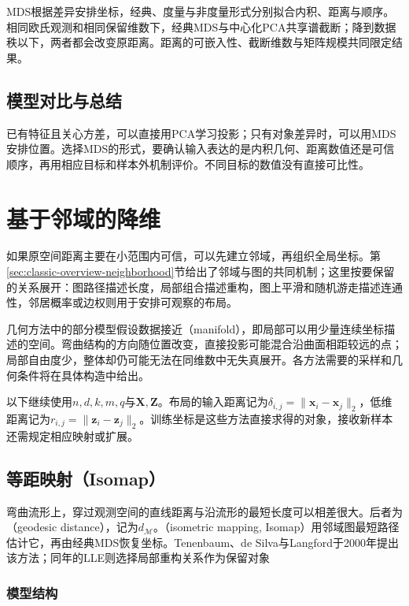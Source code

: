 MDS根据差异安排坐标，经典、度量与非度量形式分别拟合内积、距离与顺序。相同欧氏观测和相同保留维数下，经典MDS与中心化PCA共享谱截断；降到数据秩以下，两者都会改变原距离。距离的可嵌入性、截断维数与矩阵规模共同限定结果。

\subsection{模型对比与总结}

已有特征且关心方差，可以直接用PCA学习投影；只有对象差异时，可以用MDS安排位置。选择MDS的形式，要确认输入表达的是内积几何、距离数值还是可信顺序，再用相应目标和样本外机制评价。不同目标的数值没有直接可比性。

\section{基于邻域的降维}
\label{sec:dim-neighbors}
\label{sec:dim-manifold}

如果原空间距离主要在小范围内可信，可以先建立邻域，再组织全局坐标。第\ref{sec:classic-overview-neighborhood}节给出了邻域与图的共同机制；这里按要保留的关系展开：图路径描述长度，局部组合描述重构，图上平滑和随机游走描述连通性，邻居概率或边权则用于安排可观察的布局。

几何方法中的部分模型假设数据接近（manifold），即局部可以用少量连续坐标描述的空间。弯曲结构的方向随位置改变，直接投影可能混合沿曲面相距较远的点；局部自由度少，整体却仍可能无法在同维数中无失真展开。各方法需要的采样和几何条件将在具体构造中给出。

以下继续使用$n,d,k,m,q$与$\bm{X},\bm{Z}$。布局的输入距离记为$\delta_{i,j}=\lVert\bm{x}_i-\bm{x}_j\rVert_2$，低维距离记为$r_{i,j}=\lVert\bm{z}_i-\bm{z}_j\rVert_2$。训练坐标是这些方法直接求得的对象，接收新样本还需规定相应映射或扩展。

\subsection{等距映射（Isomap）}
\label{sec:dim-isomap}

弯曲流形上，穿过观测空间的直线距离与沿流形的最短长度可以相差很大。后者为（geodesic distance），记为$d_{\mathcal{M}}$。（isometric mapping, Isomap）用邻域图最短路径估计它，再由经典MDS恢复坐标。Tenenbaum、de Silva与Langford于2000年提出该方法；同年的LLE则选择局部重构关系作为保留对象

\subsubsection{模型结构}

